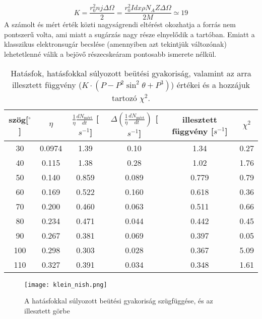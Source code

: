 \documentclass[a4paper,12pt]{article}
\begin{document}
\begin{equation}
	K=\frac{r_0^2nj\Delta\Omega}{2}=\frac{r_0^2Idx\rho N_A Z\Delta\Omega}{2M}\simeq19
	\label{eq:K}
\end{equation}
A számolt és mért érték közti nagyságrendi eltérést okozhatja a forrás nem pontszerű volta, ami miatt a sugárzás nagy része elnyelődik a tartóban. Emiatt a klasszikus elektronsugár becslése (amennyiben azt tekintjük változónak) lehetetlenné válik a bejövő részecskeáram pontosabb ismerete nélkül.
\begin{table}[h]
\begin{center}
\begin{tabular}{|c|c|c|c|c|c|}
\hline
szög[$^{\circ}$] &  $\eta$ & $\frac{1}{\eta}\frac{dN_{\text{mért}}}{dt}$ [$s^{-1}$] & $\Delta\left(\frac{1}{\eta}\frac{dN_{\text{mért}}}{dt}\right)$ [$s^{-1}$] & illesztett függvény [$s^{-1}$]& $\chi^{2}$ \\
\hline
30 & 0.0974 & 1.39 & 0.10 & 1.34 & 0.27 \\
\hline
40 & 0.115 & 1.38 & 0.28 & 1.02 & 1.76 \\
\hline
50 & 0.140 & 0.859 & 0.089 & 0.779 & 0.79 \\
\hline
60 & 0.169 & 0.522 & 0.160 & 0.618 & 0.36 \\
\hline
70 & 0.200 & 0.460 & 0.063 & 0.511 & 0.66 \\
\hline
80 & 0.234 & 0.471 & 0.044 & 0.442 & 0.45 \\
\hline
90 & 0.267 & 0.381 & 0.069 & 0.397 & 0.05 \\
\hline
100 & 0.298 & 0.303 & 0.028 & 0.367 & 5.09 \\
\hline
110 & 0.327 & 0.391 & 0.034 & 0.348 & 1.61 \\
\hline
\end{tabular}
\end{center}
\caption{Hatásfok, hatásfokkal súlyozott beütési gyakoriság, valamint az arra illesztett függvény ($K\cdot (P-P^2\sin^2{\theta}+P^3)$) értékei és a hozzájuk tartozó $\chi^2$.}
\label{tab:KN}
\end{table}

 
 \begin{figure}[!htb]
 	\begin{center} 
		\texttt{[image: klein\_nish.png]}
 	\end{center}
\caption{A hatásfokkal súlyozott beütési gyakoriság szügfüggése, és az illesztett görbe}
 \label{fig:KN}
 \end{figure}
 
\end{document}
